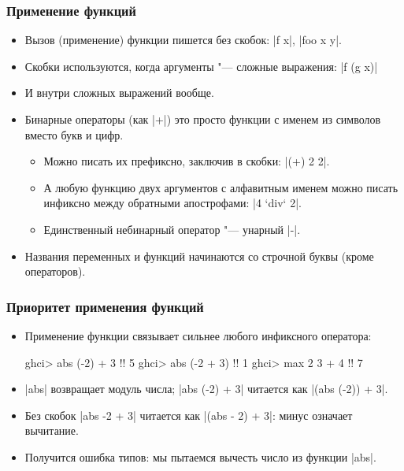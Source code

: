 \documentclass[10pt]{beamer}
\begin{document}
\begin{frame}[fragile]
  \frametitle{Применение функций}
  \begin{itemize}
    \item Вызов (применение) функции пишется без скобок: \haskinline|f x|, \haskinline|foo x y|.
    \item Скобки используются, когда аргументы "--- сложные выражения: \haskinline|f (g x)|
    \item И внутри сложных выражений вообще.
    \item Бинарные операторы (как \haskinline|+|) это просто функции с именем из символов вместо букв и цифр.
          \begin{itemize}
            \item Можно писать их префиксно, заключив в скобки: \haskinline[breaklines=false]|(+) 2 2|.
            \item А любую функцию двух аргументов с алфавитным именем можно писать инфиксно между обратными апострофами:
                  \haskinline|4 `div` 2|.
            \item Единственный небинарный оператор "--- унарный \haskinline|-|.
          \end{itemize}
    \item Названия переменных и функций начинаются со строчной буквы (кроме операторов).
  \end{itemize}
\end{frame}

\begin{frame}[fragile]
  \frametitle{Приоритет применения функций}
  \begin{itemize}
    \item Применение функции связывает сильнее любого инфиксного оператора:
          \begin{haskell}
            ghci> abs (-2) + 3 !\pause!
            5
            ghci> abs (-2 + 3) !\pause!
            1
            ghci> max 2 3 + 4 !\pause!
            7
          \end{haskell}
    \item \haskinline|abs| возвращает модуль числа; \haskinline|abs (-2) + 3| читается как \haskinline|(abs (-2)) + 3|.
    \pause
    \item Без скобок \haskinline|abs -2 + 3| читается как \haskinline|(abs - 2) + 3|: минус означает вычитание.
    \item Получится ошибка типов: мы пытаемся вычесть число из функции \haskinline|abs|.
  \end{itemize}
\end{frame}
\end{document}
